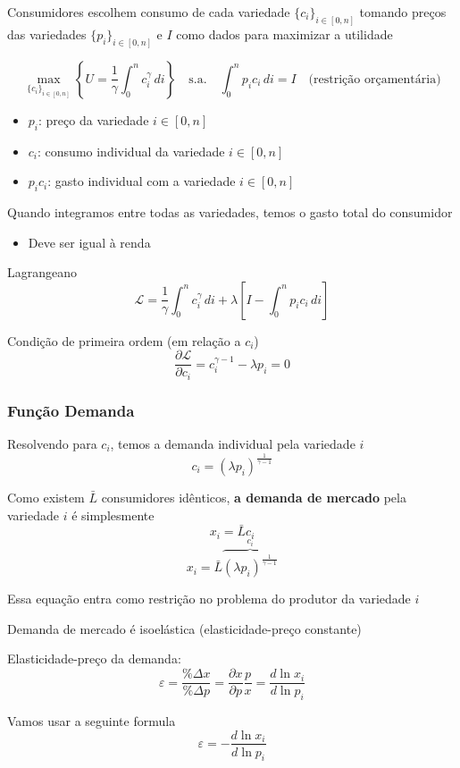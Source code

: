 \documentclass[a4paper,12pt]{article}[abntex2]
\begin{document}
Consumidores escolhem consumo de cada variedade \(\{c_i\}_{i \in [0,n]}\) tomando preços das variedades \(\{p_i\}_{i \in [0,n]}\) e \(I\) como dados para maximizar a utilidade

\[
\max_{\{c_i\}_{i \in [0,n]}} \left\{ U = \frac{1}{\gamma} \int_0^n c_i^{\gamma} \, di \right\} \quad \text{s.a.} \quad \int_0^n p_i c_i \, di = I \quad \text{(restrição orçamentária)}
\]
\begin{itemize}
    \item \(p_i\): preço da variedade \(i \in [0,n]\)
    \item \(c_i\): consumo individual da variedade \(i \in [0,n]\)
    \item \(p_i c_i\): gasto individual com a variedade \(i \in [0,n]\)
\end{itemize}

Quando integramos entre todas as variedades, temos o gasto total do consumidor
\begin{itemize}
    \item Deve ser igual à renda
\end{itemize}

Lagrangeano
\[
\mathcal{L} = \frac{1}{\gamma} \int_0^n c_i^{\gamma} \, di + \lambda \left[ I - \int_0^n p_i c_i \, di \right]
\]

Condição de primeira ordem (em relação a \(c_i\))
\[
\frac{\partial \mathcal{L}}{\partial c_i} = c_i^{\gamma - 1} - \lambda p_i = 0
\]

\subsubsection{\textbf{Função Demanda}}
Resolvendo para \(c_i\), temos a demanda individual pela variedade \(i\)
\[
c_i = (\lambda p_i)^{\frac{1}{\gamma - 1}}
\]

Como existem \(\bar{L}\) consumidores idênticos, \textbf{a demanda de mercado} pela variedade \(i\) é simplesmente
\[
x_i = \bar{L} c_i
\]
\[
x_i = \bar{L} \overbrace{(\lambda p_i)^{\frac{1}{\gamma - 1}}}^{c_i} \tag{1}
\]

Essa equação entra como restrição no problema do produtor da variedade \(i\)

Demanda de mercado é isoelástica (elasticidade-preço constante)

Elasticidade-preço da demanda:
\[
\varepsilon =\frac{\%\Delta x}{\%\Delta p}=\frac{\partial x}{\partial p}\frac{p}{x}= \frac{d \ln x_i}{d \ln p_i}
\]

Vamos usar a seguinte formula
\[
\varepsilon = -\frac{d \ln x_i}{d \ln p_i}
\]
\end{document}
